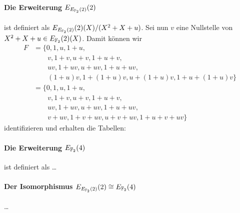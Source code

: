 \paragraph{Die Erweiterung $E_{E_{\mathbb{F}_2}(2)}(2)$} ist definiert als
$E_{E_{\mathbb{F}_2}(2)}(2)(X)/(X^2+X+u)$.
Sei nun $v$ eine Nullstelle von $X^2+X+u\in E_{\mathbb{F}_2}(2)(X)$.
Damit können wir
\begin{align*}
F&=\{ 0        , 1        , u          , 1+u             , \\
&\qquad v      , 1+v      , u+v        , 1+u+v           , \\
&\qquad uv     , 1+uv     , u+uv       , 1+u+uv          , \\
&\qquad (1+u)v , 1+(1+u)v , u + (1+u)v , 1+u + (1+u)v \}   \\
&=\{ 0       , 1      , u        , 1+u           , \\
&\qquad v    , 1+v    , u+v      , 1+u+v         , \\
&\qquad uv   , 1+uv   , u+uv     , 1+u+uv        , \\
&\qquad v+uv , 1+v+uv , u + v+uv , 1+u + v+uv \}
\end{align*}
identifizieren und erhalten die Tabellen: 

\paragraph{Die Erweiterung $E_{\mathbb{F}_2}(4)$} ist definiert als \dots

\paragraph{Der Isomorphismus $E_{E_{\mathbb{F}_2}(2)}(2)\cong E_{\mathbb{F}_2}(4)$} \dots

